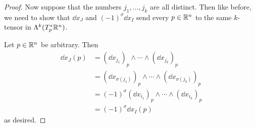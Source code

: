 \documentclass[../psets.tex]{subfiles}
\begin{document}
\begin{enumerate}[label={\textbf{2.3.\roman*.}}]
\begin{proof}
        Now suppose that the numbers $j_1,\dots,j_k$ are all distinct. Then like before, we need to show that $\dd{x_J}$ and $(-1)^\sigma\dd{x_I}$ send every $p\in\R^n$ to the same $k$-tensor in $\lam[k]{T_p^*\R^n}$.\par
        Let $p\in\R^n$ be arbitrary. Then
        \begin{align*}
            \dd{x_J}(p) &= (\dd{x_{j_1}})_p\wedge\cdots\wedge(\dd{x_{j_k}})_p\\
            &= (\dd{x_{\sigma(j_1)}})_p\wedge\cdots\wedge(\dd{x_{\sigma(j_k)}})_p\\
            &= (-1)^{\sigma}(\dd{x_{i_1}})_p\wedge\cdots\wedge(\dd{x_{i_k}})_p\tag*{Claim 1.6.8}\\
            &= (-1)^{\sigma}\dd{x_I}(p)
        \end{align*}
        as desired.
    \end{proof}
\end{enumerate}
\end{document}
